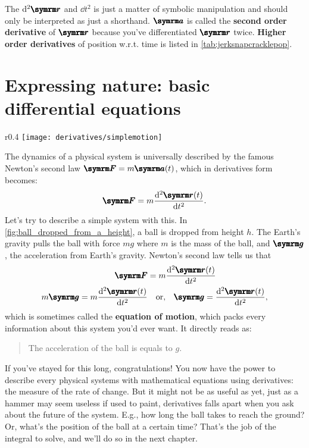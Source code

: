 The $\dd[2]{\vv{r}}$ and $\dd{t}^2$ is just a matter of symbolic manipulation and should only be interpreted as just a shorthand. $\vv{a}$ is called the \textbf{second order derivative} of $\vv{r}$ because you've differentiated $\vv{r}$ twice. \textbf{Higher order derivatives} of position w.r.t. time is listed in \cref{tab:jerksnapcracklepop}.

\section{Expressing nature: basic differential equations}
\label{sec:basicdifferentialequations}

\begin{wrapfigure}[15]{r}{0.4\textwidth}
    \centering
    \texttt{[image: derivatives/simplemotion]}
    \caption{A ball dropped from height $h$}
    \label{fig:ball_dropped_from_a_height}
\end{wrapfigure}
The dynamics of a physical system is universally described by the famous Newton's second law $\vv{F} = m\vv{a}(t)$, which in derivatives form becomes:
\begin{equation}
    \vv{F} = m\dv[2]{\vv{r}(t)}{t}. \label{eq:newton_second_law}
\end{equation}
Let's try to describe a simple system with this. In \cref{fig:ball_dropped_from_a_height}, a ball is dropped from height $h$. The Earth's gravity pulls the ball with force $mg$ where $m$ is the mass of the ball, and $\vv{g}$, the acceleration from Earth's gravity. Newton's second law tells us that
\begin{align}
    \vv{F} &= m\dv[2]{\vv{r}(t)}{t} \nonumber\\
    m\vv{g} = m\dv[2]{\vv{r}(t)}{t} &\quad \textrm{or,} \quad \vv{g} = \dv[2]{\vv{r}(t)}{t},
\end{align}
which is sometimes called the \textbf{equation of motion}, which packs every information about this system you'd ever want. It directly reads as:
\begin{quotation}
    The acceleration of the ball is equals to $g$.
\end{quotation}
If you've stayed for this long, congratulations! You now have the power to describe every physical systems with mathematical equations using derivatives: the measure of the rate of change. But it might not be as useful as yet, just as a hammer may seem useless if used to paint, derivatives falls apart when you ask about the future of the system. E.g., how long the ball takes to reach the ground? Or, what's the position of the ball at a certain time? That's the job of the integral to solve, and we'll do so in the next chapter.

